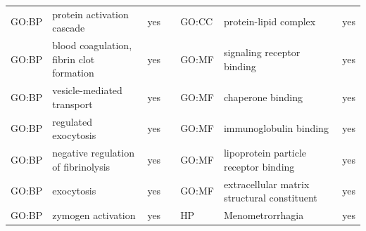\begin{longtable}{@{}lp{4cm}lllp{4cm}l@{}}
GO:BP           & protein activation cascade                                                                                                         & yes              &           & GO:CC           & protein-lipid complex                                                                                                                                                  & yes              \\
GO:BP           & blood coagulation, fibrin clot formation                                                                                           & yes              &           & GO:MF           & signaling receptor binding                                                                                                                                             & yes              \\
GO:BP           & vesicle-mediated transport                                                                                                         & yes              &           & GO:MF           & chaperone binding                                                                                                                                                      & yes              \\
GO:BP           & regulated exocytosis                                                                                                               & yes              &           & GO:MF           & immunoglobulin binding                                                                                                                                                 & yes              \\
GO:BP           & negative regulation of fibrinolysis                                                                                                & yes              &           & GO:MF           & lipoprotein particle receptor binding                                                                                                                                  & yes              \\
GO:BP           & exocytosis                                                                                                                         & yes              &           & GO:MF           & extracellular matrix structural constituent                                                                                                                            & yes              \\
GO:BP           & zymogen activation                                                                                                                 & yes              &           & HP              & Menometrorrhagia                                                                                                                                                       & yes              \\

\end{longtable}
